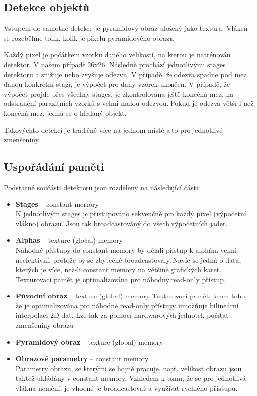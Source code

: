 \documentclass[12pt,a4paper,titlepage,final]{report}
\begin{document}
\subsection{Detekce objektů}
Vstupem do samotné detekce je pyramidový obraz uložený jako textura. Vláken se rozeběhne tolik, kolik je pixelů pyramidového obrazu.

Každý pixel je počátkem vzorku daného velikostí, na kterou je natrénován detektor. V našem případě 26x26. Následně prochází jednotlivými stages detektoru a snižuje nebo zvyšuje odezvu. V případě, že odezva spadne pod mez danou konkrétní stagí, je výpočet pro daný vzorek ukončen. V případě, že výpočet projde přes všechny stages, je zkontrolována ještě konečná mez, na odstranění parazitních vzorků s velmi malou odezvou. Pokud je odezva větší i než konečná mez, jedná se o hledaný objekt.

Takovýchto detekcí je tradičně více na jednom místě a to pro jednotlivé zmenšeniny.

\subsection{Uspořádání paměti}
Podstatné součásti detektoru jsou rozděleny na následující části:

\begin{itemize}
\item \textbf{Stages} – constant memory \\
	K jednotlivým stages je přistupováno sekvenčně pro každý pixel (výpočetní vlákno) obrazu. Jsou tak broadcastováný do všech výpočetních jader.
\item \textbf{Alphas} – texture (global) memory \\
	Náhodné přístupy do constant memory by dělali přístup k alphám velmi neefektivní, protože by se zbytečně broadcastovaly. Navíc se jedná o data, kterých je více, než-li constant memory na většině grafických karet. Texturovací pamět je optimalizována pro náhodný read-only přístup.
	
\item \textbf{Původní obraz} – texture (global) memory
	Texturovací pamět, krom toho, že je optimalizována pro náhodné read-only přístupy umožňuje bilineární interpolaci 2D dat. Lze tak za pomocí hardwarových jednotek počítat zmenšeniny obrazu
	
\item \textbf{Pyramidový obraz} – texture (global) memory

\item \textbf{Obrazové parametry} – constant memory \\
	Parametry obrazu, se kterými se hojně pracuje, např. velikost obrazu jsou taktéž ukládány v constant memory. Vzhledem k tomu, že se pro jednotlivá vlákna nemění, je vhodné je broadcastovat a využívat rychlého přístupu.
\end{itemize}
	
\end{document}
